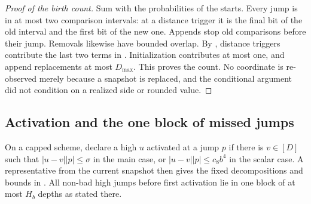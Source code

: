\begin{proof}[Proof of the birth count]
Sum  with the probabilities of the starts.
Every jump is in at most two comparison intervals: at a distance trigger
it is the final bit of the old interval and the first bit of the new one.
Appends stop old comparisons before their jump. Removals likewise have
bounded overlap. By , distance
triggers contribute the last two terms in
. Initialization contributes at most one, and
append replacements at most $D_{\max}$. This proves the count. No coordinate
is re-observed merely because a snapshot is replaced, and the conditional
argument did not condition on a realized side or rounded value.
\end{proof}

\subsection{Activation and the one block of missed jumps}

\begin{lemma}
\label{lemma:07-activation}
On a capped scheme, declare a high $u$ activated at a jump $p$ if there is
$v\in[D]$ such that $|u-v||p|\le\sigma$ in the main case, or
$|u-v||p|\le c_8b^4$ in the scalar case. A representative from the current
snapshot then gives the fixed decompositions and bounds in
. All non-bad high jumps before first activation lie in
one block of at most $H_b$ depths as stated there.
\end{lemma}

